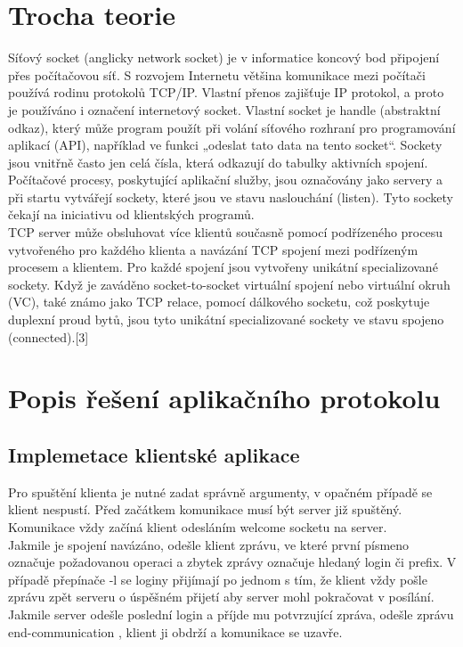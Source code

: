 \documentclass[11pt]{article}
\begin{document}
	\section{Trocha teorie}
	\begin{flushleft}
		Síťový socket (anglicky network socket) je v informatice koncový bod připojení přes počítačovou síť. S rozvojem Internetu většina komunikace mezi počítači používá rodinu protokolů TCP/IP. Vlastní přenos zajišťuje IP protokol, a proto je používáno i označení internetový socket. Vlastní socket je handle (abstraktní odkaz), který může program použít při volání síťového rozhraní pro programování aplikací (API), například ve funkci „odeslat tato data na tento socket“. Sockety jsou vnitřně často jen celá čísla, která odkazují do tabulky aktivních spojení.\\[0.5 cm]
		
		Počítačové procesy, poskytující aplikační služby, jsou označovány jako servery a při startu vytvářejí sockety, které jsou ve stavu naslouchání (listen). Tyto sockety čekají na iniciativu od klientských programů.\\[0.5 cm]
		
		TCP server může obsluhovat více klientů současně pomocí podřízeného procesu vytvořeného pro každého klienta a navázání TCP spojení mezi podřízeným procesem a klientem. Pro každé spojení jsou vytvořeny unikátní specializované sockety. Když je zaváděno socket-to-socket virtuální spojení nebo virtuální okruh (VC), také známo jako TCP relace, pomocí dálkového socketu, což poskytuje duplexní proud bytů, jsou tyto unikátní specializované sockety ve stavu spojeno (connected).[3]\\[0.5 cm] 			
	\end{flushleft}
	
	\newpage
	\section{Popis řešení aplikačního protokolu}
		\subsection{Implemetace klientské aplikace}
			\begin{flushleft}
				Pro spuštění klienta je nutné zadat správně argumenty, v opačném případě se klient nespustí.	Před začátkem komunikace musí být server již spuštěný. Komunikace vždy začíná klient odesláním welcome socketu na server.\\[0.5 cm] 
				Jakmile je spojení navázáno, odešle klient zprávu, ve které první písmeno označuje požadovanou operaci a zbytek zprávy označuje hledaný login či prefix. V případě přepínače -l se loginy přijímají po jednom s tím, že klient vždy pošle zprávu zpět serveru o úspěšném přijetí aby server mohl pokračovat v posílání. Jakmile server odešle poslední login a příjde mu potvrzující zpráva, odešle zprávu end-communication , klient ji obdrží a komunikace se uzavře.\par		
			\end{flushleft}
			
\end{document}
